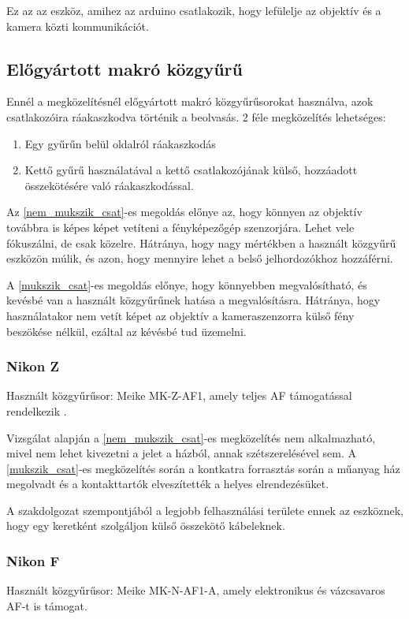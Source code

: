 Ez az az eszköz, amihez az arduino csatlakozik, hogy lefülelje az objektív és a kamera közti kommunikációt.
\subsection{Előgyártott makró közgyűrű}
Ennél a megközelítésnél előgyártott makró közgyűrűsorokat használva, azok csatlakozóira ráakaszkodva történik a beolvasás.
2 féle megközelítés lehetséges:
\begin{enumerate}
    \item Egy gyűrűn belül oldalról ráakaszkodás \label{nem_mukszik_csat}
    \item Kettő gyűrű használatával a kettő csatlakozójának külső, hozzáadott összekötésére való ráakaszkodással.\label{mukszik_csat}
\end{enumerate}

Az \ref{nem_mukszik_csat}-es megoldás előnye az, hogy könnyen az objektív továbbra is képes képet vetíteni a fényképezőgép szenzorjára. Lehet vele fókuszálni, de csak közelre.
Hátránya, hogy nagy mértékben a használt közgyűrű eszközön múlik, és azon, hogy mennyire lehet a belső jelhordozókhoz hozzáférni.

A \ref{mukszik_csat}-es megoldás előnye, hogy könnyebben megvalósítható, és kevésbé van a használt közgyűrűnek hatása a megvalósításra.
Hátránya, hogy használatakor nem vetít képet az objektív a kameraszenzorra külső fény beszökése nélkül, ezáltal az kévésbé tud üzemelni.  
\subsubsection{Nikon Z}
Használt közgyűrűsor: Meike MK-Z-AF1, amely teljes AF támogatással rendelkezik \cite{meike_z}.

Vizsgálat alapján a \ref{nem_mukszik_csat}-es megközelítés nem alkalmazható, mivel nem lehet kivezetni a jelet a házból, annak szétszerelésével sem.
A \ref{mukszik_csat}-es megközelítés során a kontkatra forrasztás során a műanyag ház megolvadt és a kontakttartók elveszítették a helyes elrendezésüket.

A szakdolgozat szempontjából a legjobb felhasználási területe ennek az eszköznek, hogy egy keretként szolgáljon külső összekötő kábeleknek.
\subsubsection{Nikon F}
Használt közgyűrűsor: Meike MK-N-AF1-A, amely elektronikus és vázcsavaros AF-t is támogat.\cite{meike_f}

